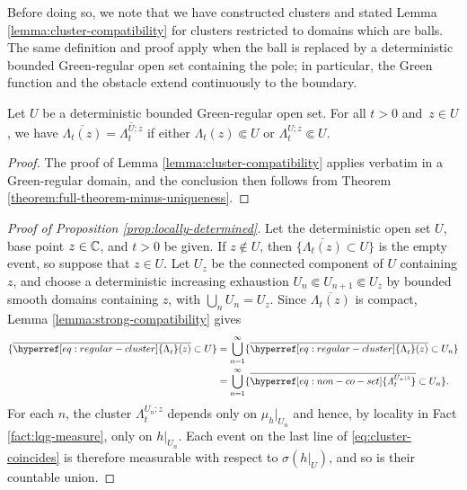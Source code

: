 \documentclass[12pt]{amsart}
\numberwithin{equation}{section}
\newcommand{\cluster}[2]{\hyperref[eq:non-co-set]{\mathit{\Lambda}^{#1}_{#2}}}
\newcommand{\regcluster}[2]{\hyperref[eq:regular-cluster]{\Lambda^{#1}_{#2}}}
\begin{document}
	Before doing so, we note that we have constructed clusters and stated Lemma \ref{lemma:cluster-compatibility} for clusters restricted to domains which are balls.
	The same definition and proof apply when the ball is replaced by a deterministic bounded Green-regular open set containing the pole; in particular, the Green function and the obstacle extend continuously to the boundary.

	\begin{lemma} \label{lemma:strong-compatibility}
		Let $U$ be a deterministic bounded Green-regular open set. 
		For all $t > 0$ and~$z \in U$, we have $\overline{{\regcluster{}{t}(z)}} = \overline{\cluster{U; z}{t}}$ if either ${\regcluster{}{t}(z)} \Subset U$ or $\cluster{U; z}{t} \Subset U$.
	\end{lemma}
	\begin{proof}
		The proof of Lemma \ref{lemma:cluster-compatibility} applies verbatim in a Green-regular domain, and the conclusion then follows from Theorem \ref{theorem:full-theorem-minus-uniqueness}. 
	\end{proof}





	\begin{proof}[Proof of Proposition \ref{prop:locally-determined}] 
		Let the deterministic open set $U$, base point $z \in \mathbb{C}$, and $t > 0$ be given. If $z\notin U$, then $\{\overline{{\regcluster{}{t}(z)}}\subset U\}$ is the empty event, so suppose that $z\in U$.
		Let $U_z$ be the connected component of $U$ containing $z$, and choose a deterministic increasing exhaustion $U_n\Subset U_{n+1}\Subset U_z$ by bounded smooth domains containing $z$, with $\bigcup_n U_n=U_z$.
		Since $\overline{{\regcluster{}{t}(z)}}$ is compact, Lemma \ref{lemma:strong-compatibility} gives
		\begin{align} \label{eq:cluster-coincides}
		\{\overline{{\regcluster{}{t}(z)}}\subset U\}
		&=\bigcup_{n=1}^{\infty}\{\overline{{\regcluster{}{t}(z)}}\subset U_n\} \notag\\
		&=\bigcup_{n=1}^{\infty}\{\overline{\cluster{U_n;z}{t}}\subset U_n\}.
		\end{align}
		For each $n$, the cluster $\cluster{U_n;z}{t}$ depends only on $\mu_h|_{U_n}$ and hence, by locality in Fact \ref{fact:lqg-measure}, only on $h|_{U_n}$. Each event on the last line of \eqref{eq:cluster-coincides} is therefore measurable with respect to $\sigma(h|_U)$, and so is their countable union.
	\end{proof}
	
\end{document}
